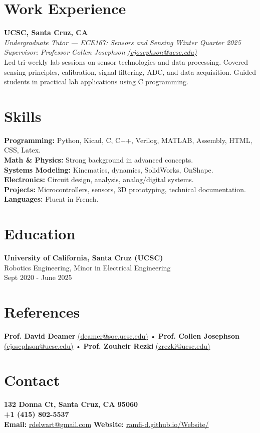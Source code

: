 \documentclass[a4paper,9pt]{article}
\begin{document}
\section*{Work Experience}
\small
\textbf{UCSC, Santa Cruz, CA} \\
\textit{Undergraduate Tutor — ECE167: Sensors and Sensing \hfill Winter Quarter 2025} \\
\textit{Supervisor: Professor Collen Josephson \href{mailto:cjosephson@ucsc.edu}{(cjosephson@ucsc.edu)}} \\[0.3em]
\footnotesize
Led tri-weekly lab sessions on sensor technologies and data processing. Covered sensing principles, calibration, signal filtering, ADC, and data acquisition. Guided students in practical lab applications using C programming.
\normalsize

\section*{Skills}
\small
\textbf{Programming:} Python, Kicad, C, C++, Verilog, MATLAB, Assembly, HTML, CSS, Latex. \\
\textbf{Math \& Physics:} Strong background in advanced concepts. \\
\textbf{Systems Modeling:} Kinematics, dynamics, SolidWorks, OnShape. \\
\textbf{Electronics:} Circuit design, analysis, analog/digital systems. \\
\textbf{Projects:} Microcontrollers, sensors, 3D prototyping, technical documentation. \\
\textbf{Languages:} Fluent in French.
\normalsize

\section*{Education}
\small
\textbf{University of California, Santa Cruz (UCSC)} \\
Robotics Engineering, Minor in Electrical Engineering \\
Sept 2020 - June 2025

\section*{References}
\footnotesize
\textbf{Prof. David Deamer} \href{mailto:deamer@soe.ucsc.edu}{(deamer@soe.ucsc.edu)} • \textbf{Prof. Collen Josephson} \href{mailto:cjosephson@ucsc.edu}{(cjosephson@ucsc.edu)} • \textbf{Prof. Zouheir Rezki} \href{mailto:zrezki@ucsc.edu}{(zrezki@ucsc.edu)}
\normalsize

\section*{Contact}
\textbf{132 Donna Ct, Santa Cruz, CA 95060} \\
\textbf{+1 (415) 802-5537} \\
\textbf{Email:} \href{mailto:rdelwart@gmail.com}{rdelwart@gmail.com}\normalsize
\textbf{Website:} \href{https://ramfi-d.github.io/Website/}{ramfi-d.github.io/Website/}
\normalsize
\end{document}
